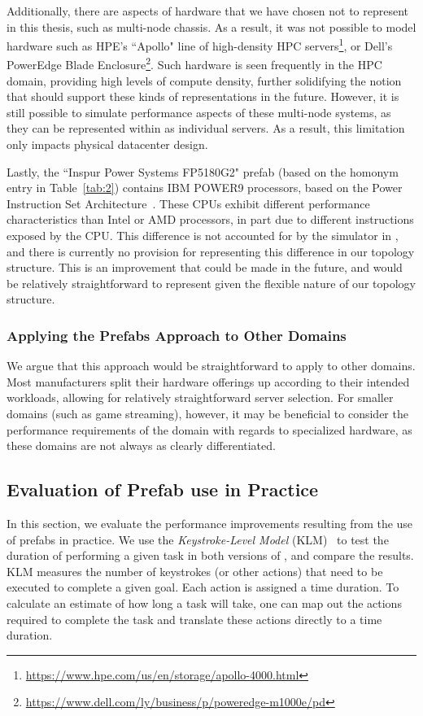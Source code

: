 \documentclass[11pt]{article}
\begin{document}
			Additionally, there are aspects of hardware that we have chosen not to represent in this thesis, such as multi-node chassis.
			As a result, it was not possible to model hardware such as HPE's ``Apollo" line of high-density HPC servers\footnote{\url{https://www.hpe.com/us/en/storage/apollo-4000.html}}, or Dell's PowerEdge Blade Enclosure\footnote{\url{https://www.dell.com/ly/business/p/poweredge-m1000e/pd}}.
			Such hardware is seen frequently in the HPC domain, providing high levels of compute density, further solidifying the notion that \opendc{} should support these kinds of representations in the future.
			However, it is still possible to simulate performance aspects of these multi-node systems, as they can be represented within \opendc{} as individual servers.
			As a result, this limitation only impacts physical datacenter design.

			Lastly, the ``Inspur Power Systems FP5180G2" prefab (based on the homonym entry in Table~\ref{tab:2}) contains IBM POWER9 processors, based on the Power Instruction Set Architecture~\cite{IBM2017}.
			These CPUs exhibit different performance characteristics than Intel or AMD processors, in part due to different instructions exposed by the CPU.
			This difference is not accounted for by the simulator in \opendc{}, and there is currently no provision for representing this difference in our topology structure.
			This is an improvement that could be made in the future, and would be relatively straightforward to represent given the flexible nature of our topology structure.


		\subsubsection{Applying the Prefabs Approach to Other Domains}
			We argue that this approach would be straightforward to apply to other domains.
			Most manufacturers split their hardware offerings up according to their intended workloads, allowing for relatively straightforward server selection.
			For smaller domains (such as game streaming), however, it may be beneficial to consider the performance requirements of the domain with regards to specialized hardware, as these domains are not always as clearly differentiated.

	\subsection{Evaluation of Prefab use in Practice}
		In this section, we evaluate the performance improvements resulting from the use of prefabs in practice.
		We use the \textit{Keystroke-Level Model} (KLM)~\cite{Newell1980} to test the duration of performing a given task in both versions of \opendc{}, and compare the results.
		KLM measures the number of keystrokes (or other actions) that need to be executed to complete a given goal. 
		Each action is assigned a time duration.
		To calculate an estimate of how long a task will take, one can map out the actions required to complete the task and translate these actions directly to a time duration.
\end{document}
